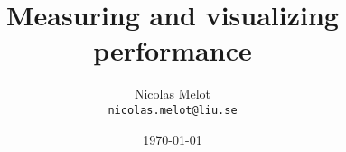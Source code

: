 \documentclass{article}
\begin{document}
\title{Measuring and visualizing performance\\}
\author{Nicolas Melot \\
\texttt{nicolas.melot@liu.se}
}
\date{\today}

\maketitle



\cleardoublepage
{}

\end{document}
